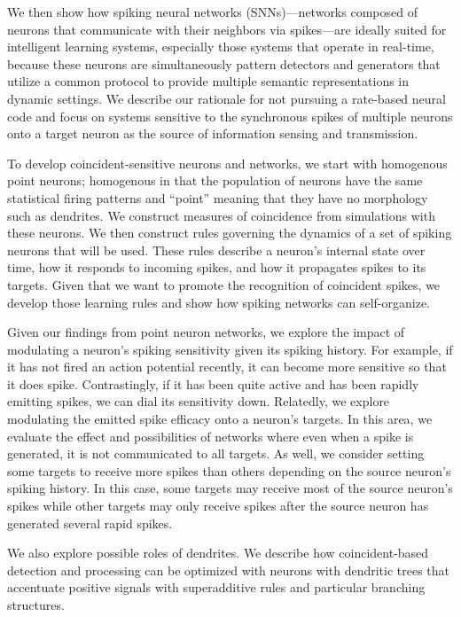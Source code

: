 We then show how spiking neural networks (SNNs)---networks composed of neurons that communicate with their neighbors via spikes---are ideally suited for intelligent learning systems, especially those systems that operate in real-time, because these neurons are simultaneously pattern detectors and generators that utilize a common protocol to provide multiple semantic representations in dynamic settings.
We describe our rationale for not pursuing a rate-based neural code and focus on systems sensitive to the synchronous spikes of multiple neurons onto a target neuron as the source of information sensing and transmission.

To develop coincident-sensitive neurons and networks, we start with homogenous point neurons; homogenous in that the population of neurons have the same statistical firing patterns and ``point'' meaning that they have no morphology such as dendrites.
We construct measures of coincidence from simulations with these neurons.
We then construct rules governing the dynamics of a set of spiking neurons that will be used.
These rules describe a neuron's internal state over time, how it responds to incoming spikes, and how it propagates spikes to its targets.
Given that we want to promote the recognition of coincident spikes, we develop those learning rules and show how spiking networks can self-organize.

Given our findings from point neuron networks, we explore the impact of modulating a neuron's spiking sensitivity given its spiking history.
For example, if it has not fired an action potential recently, it can become more sensitive so that it does spike.
Contrastingly, if it has been quite active and has been rapidly emitting spikes, we can dial its sensitivity down.
Relatedly, we explore modulating the emitted spike efficacy onto a neuron's targets.
In this area, we evaluate the effect and possibilities of networks where even when a spike is generated, it is not communicated to all targets.
As well, we consider setting some targets to receive more spikes than others depending on the source neuron's spiking history.
In this case, some targets may receive most of the source neuron's spikes while other targets may only receive spikes after the source neuron has generated several rapid spikes.

We also explore possible roles of dendrites.
We describe how coincident-based detection and processing can be optimized with neurons with dendritic trees that accentuate positive signals with superadditive rules and particular branching structures.

